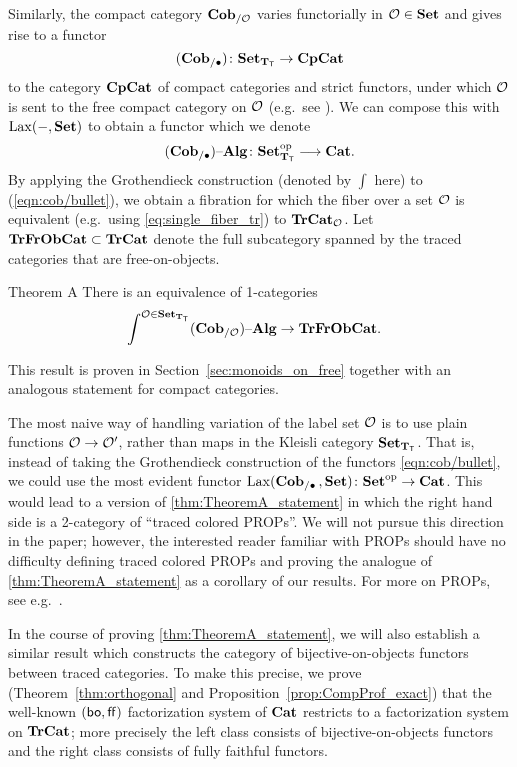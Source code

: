 \documentclass[11pt,oneside,article]{memoir}
\begin{document}
Similarly, the compact category $\mathbf{Cob}_{/\mathcal{O}}$ varies functorially in $\mathcal{O}\in\mathbf{Set}$ and gives rise to a functor
\[(\mathbf{Cob}_{/\bullet})\colon\mathbf{Set}_{\mathbf{T}_{\mathsf{T}}}\to\mathbf{CpCat}\]
to the category $\mathbf{CpCat}$ of compact categories and strict functors, under which $\mathcal{O}$ is sent to the free compact category on $\mathcal{O}$ (e.g.\ see \cite{KellyLaplaza,Abramsky2}).  We can compose this with $\operatorname{Lax}(-,\mathbf{Set})$ to obtain a functor which we denote
\begin{equation}
      \label{eqn:cob/bullet}
   (\mathbf{Cob}_{/\bullet}){\text \textendash}\mathbf{Alg}\colon\mathbf{Set}_{\mathbf{T}_{\mathsf{T}}}^{\mathrm{op}}\longrightarrow\mathbf{Cat}.
\end{equation}
By applying the Grothendieck construction (denoted by $\int$ here) to (\ref{eqn:cob/bullet}), we obtain a fibration for which the fiber over a set $\mathcal{O}$ is equivalent (e.g.\ using \eqref{eq:single_fiber_tr}) to $\mathbf{TrCat}_{\mathcal{O}}$.  Let $\mathbf{TrFrObCat}\subset\mathbf{TrCat}$ denote the full subcategory spanned by the traced categories that are free-on-objects.
\begin{named}{Theorem A}
      \label{thm:TheoremA_statement}
  There is an equivalence of 1-categories
  \begin{align*}
     &\int^{\mathcal{O}\in\mathbf{Set}_{\mathbf{T}_{\mathsf{T}}}}(\mathbf{Cob}_{/\mathcal{O}}){\text \textendash}\mathbf{Alg} \to \mathbf{TrFrObCat}.
  \end{align*}
\end{named}
This result is proven in Section~\ref{sec:monoids_on_free} together with an analogous statement for compact categories.
\begin{remark}
   The most naive way of handling variation of the label set $\mathcal{O}$ is to use plain functions $\mathcal{O}\to\mathcal{O}'$, rather than maps in the Kleisli category $\mathbf{Set}_{\mathbf{T}_{\mathsf{T}}}$. That is, instead of taking the Grothendieck construction of the functors \eqref{eqn:cob/bullet}, we could use the most evident functor $\operatorname{Lax}(\mathbf{Cob}_{/\bullet}\,,\mathbf{Set})\colon{\mathbf{Set}}^{\text{op}}\to\mathbf{Cat}$. This would lead to a version of \ref{thm:TheoremA_statement} in which the right hand side is a 2-category of ``traced colored PROPs''. We will not pursue this direction in the paper; however, the interested reader familiar with PROPs should have no difficulty defining traced colored PROPs and proving the analogue of \ref{thm:TheoremA_statement} as a corollary of our results. For more on PROPs, see e.g.~\cite{HackneyRobertson}.
\end{remark}

In the course of proving \ref{thm:TheoremA_statement}, we will also establish a similar result which constructs the category of bijective-on-objects functors between traced categories.  To make this precise, we prove (Theorem~\ref{thm:orthogonal} and Proposition~\ref{prop:CompProf_exact}) that the well-known $(\mathsf{bo},\mathsf{ff})$ factorization system of $\mathbf{Cat}$ restricts to a factorization system on $\mathbf{TrCat}$; more precisely the left class consists of bijective-on-objects functors and the right class consists of fully faithful functors. 
\end{document}
